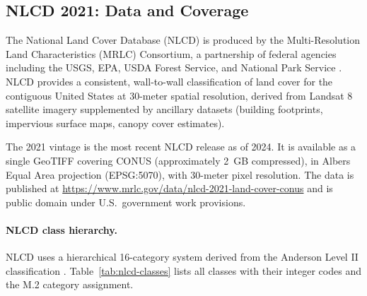 \label{sec:background}

\subsection{NLCD 2021: Data and Coverage}

The National Land Cover Database (NLCD) is produced by the Multi-Resolution
Land Characteristics (MRLC) Consortium, a partnership of federal agencies
including the USGS, EPA, USDA Forest Service, and National Park Service
\citep{homer2020nlcd}.
NLCD provides a consistent, wall-to-wall classification of land cover for
the contiguous United States at 30-meter spatial resolution, derived from
Landsat 8 satellite imagery supplemented by ancillary datasets (building
footprints, impervious surface maps, canopy cover estimates).

The 2021 vintage is the most recent NLCD release as of 2024.
It is available as a single GeoTIFF covering CONUS (approximately 2~GB
compressed), in Albers Equal Area projection (EPSG:5070), with 30-meter
pixel resolution.
The data is published at \url{https://www.mrlc.gov/data/nlcd-2021-land-cover-conus}
and is public domain under U.S.\ government work provisions.

\paragraph{NLCD class hierarchy.}
NLCD uses a hierarchical 16-category system derived from the Anderson
Level II classification \citep{anderson1976land}.
Table~\ref{tab:nlcd-classes} lists all classes with their integer codes
and the M.2 category assignment.

